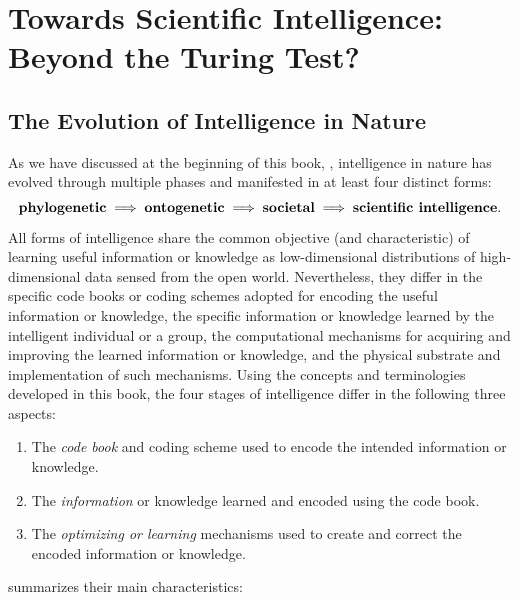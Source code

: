 \documentclass[../../book-main.tex]{subfiles}
\begin{document}
\section{Towards Scientific Intelligence: Beyond the Turing Test?}

\subsection{The Evolution of Intelligence in Nature}
As we have discussed at the beginning of this book, ,
intelligence in nature has evolved through multiple phases and
manifested in at least four distinct forms:
\begin{equation}
    \text{\textbf{phylogenetic}} \;
    \Longrightarrow \; \text{\textbf{ontogenetic}} \;
    \Longrightarrow \; \text{\textbf{societal}} \;
    \Longrightarrow \; \text{\textbf{scientific intelligence}}.
\end{equation}
All forms of intelligence share the common objective (and
characteristic) of learning useful information or knowledge as low-dimensional
distributions of high-dimensional data sensed from the open world.
Nevertheless, they differ in the specific code books or coding schemes 
adopted for encoding the useful information or knowledge, the specific 
information or knowledge learned by the intelligent individual or a group, 
the computational mechanisms for acquiring and improving the learned 
information or knowledge, and the physical substrate and implementation of 
such mechanisms. Using the concepts and terminologies developed in this book, 
the four stages of intelligence differ in the following three aspects:
\begin{enumerate}
    \item The \textit{code book} and coding scheme used to encode the
        intended information or knowledge.
    \item The \textit{information} or knowledge learned and encoded
        using the code book.
    \item The \textit{optimizing or learning} mechanisms used to create and
        correct the encoded information or knowledge.
\end{enumerate}
 summarizes their main characteristics:
\end{document}
